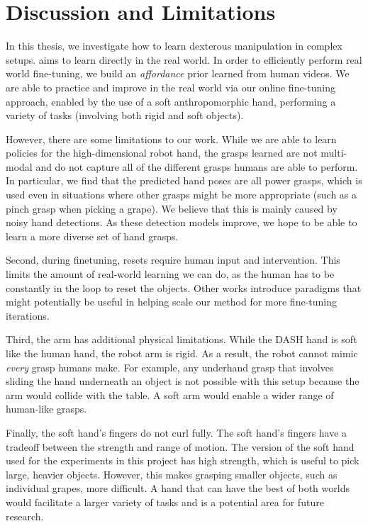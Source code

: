\section{Discussion and Limitations}
\label{sec:discussion}

In this thesis, we investigate how to learn dexterous manipulation in complex setups. \ours aims to learn directly in the real world. In order to efficiently perform real world fine-tuning, we build an \textit{affordance} prior learned from human videos. We are able to practice and improve in the real world via our online fine-tuning approach, enabled by the use of a soft anthropomorphic hand, performing a variety of tasks (involving both rigid and soft objects).

However, there are some limitations to our work.  While we are able to learn policies for the high-dimensional robot hand, the grasps learned are not multi-modal and do not capture all of the different grasps humans are able to perform.  In particular, we find that the predicted hand poses are all power grasps, which is used even in situations where other grasps might be more appropriate (such as a pinch grasp when picking a grape). We believe that this is mainly caused by noisy hand detections. As these detection models improve, we hope to be able to learn a more diverse set of hand grasps. 

Second, during finetuning, resets require human input and intervention. This limits the amount of real-world learning we can do, as the human has to be constantly in the loop to reset the objects. Other works \cite{chen2022single, guptaYuZhaoKumar2021reset} introduce paradigms that might potentially be useful in helping scale our method for more fine-tuning iterations.

Third, the arm has additional physical limitations. While the DASH hand is soft like the human hand, the robot arm is rigid. As a result, the robot cannot mimic \textit{every} grasp humans make. For example, any underhand grasp that involves sliding the hand underneath an object is not possible with this setup because the arm would collide with the table. A soft arm would enable a wider range of human-like grasps.

Finally, the soft hand's fingers do not curl fully. The soft hand's fingers have a tradeoff between the strength and range of motion. The version of the soft hand used for the experiments in this project has high strength, which is useful to pick large, heavier objects. However, this makes grasping smaller objects, such as individual grapes, more difficult. A hand that can have the best of both worlds would facilitate a larger variety of tasks and is a potential area for future research.